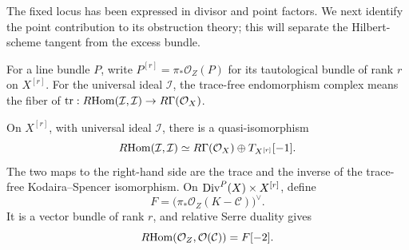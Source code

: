 The fixed locus has been expressed in divisor and point factors.
We next identify the point contribution to its obstruction theory;
this will separate the Hilbert-scheme tangent from the excess bundle.

For a line bundle \(P\), write
\(P^{[r]}=\pi_*\mathcal O_Z(P)\) for its tautological bundle
of rank \(r\) on \(X^{[r]}\).
For the universal ideal \(\mathcal I\), the trace-free endomorphism
complex means the fiber of
\(\operatorname{tr}:R\!\operatorname{Hom}(\mathcal I,\mathcal I)
\to R\Gamma(\mathcal O_X)\).

\begin{lemma}\label{fix:trace}
On \(X^{[r]}\), with universal ideal \(\mathcal I\), there is a
quasi-isomorphism
\begin{equation}\label{fix:hilbert-splitting}
 R\!\operatorname{Hom}(\mathcal I,\mathcal I)
 \simeq R\Gamma(\mathcal O_X)\oplus T_{X^{[r]}}[-1].
\end{equation}
The two maps to the right-hand side are the trace and the inverse of
the trace-free Kodaira--Spencer isomorphism.
On \(\operatorname{Div}^P(X)\times X^{[r]}\), define
\begin{equation}\label{fix:point-bundle}
 F=\bigl(\pi_*\mathcal O_Z(K-\mathcal C)\bigr)^\vee.
\end{equation}
It is a vector bundle of rank \(r\), and relative Serre duality gives
\begin{equation}\label{fix:point-duality}
 R\!\operatorname{Hom}(\mathcal O_Z,\mathcal O(\mathcal C))=F[-2].
\end{equation}
\end{lemma}

